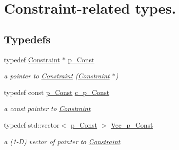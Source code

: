 \hypertarget{group___constraint___t_y_p_e_s}{}\section{Constraint-\/related types.}
\label{group___constraint___t_y_p_e_s}
\subsection*{Typedefs}
\begin{DoxyCompactItemize}
\item 
\mbox{\label{group___constraint___t_y_p_e_s_gae2abae1fd3e9370e1c0cc9dfbb4d6718}} 
typedef \mbox{\hyperlink{class_s_m_spp__di__unipi__it_1_1_constraint}{Constraint}} $\ast$ \mbox{\hyperlink{group___constraint___t_y_p_e_s_gae2abae1fd3e9370e1c0cc9dfbb4d6718}{p\+\_\+\+Const}}
\begin{DoxyCompactList}\small\item\em a pointer to \mbox{\hyperlink{class_s_m_spp__di__unipi__it_1_1_constraint}{Constraint}} (\mbox{\hyperlink{class_s_m_spp__di__unipi__it_1_1_constraint}{Constraint}} $\ast$) \end{DoxyCompactList}\item 
\mbox{\label{group___constraint___t_y_p_e_s_ga9c035399735cd8e147d1f912ba79a1c2}} 
typedef const \mbox{\hyperlink{group___constraint___t_y_p_e_s_gae2abae1fd3e9370e1c0cc9dfbb4d6718}{p\+\_\+\+Const}} \mbox{\hyperlink{group___constraint___t_y_p_e_s_ga9c035399735cd8e147d1f912ba79a1c2}{c\+\_\+p\+\_\+\+Const}}
\begin{DoxyCompactList}\small\item\em a const pointer to \mbox{\hyperlink{class_s_m_spp__di__unipi__it_1_1_constraint}{Constraint}} \end{DoxyCompactList}\item 
\mbox{\label{group___constraint___t_y_p_e_s_ga4ce7980e39e7cfce6c532e9475fb5001}} 
typedef std\+::vector$<$ \mbox{\hyperlink{group___constraint___t_y_p_e_s_gae2abae1fd3e9370e1c0cc9dfbb4d6718}{p\+\_\+\+Const}} $>$ \mbox{\hyperlink{group___constraint___t_y_p_e_s_ga4ce7980e39e7cfce6c532e9475fb5001}{Vec\+\_\+p\+\_\+\+Const}}
\begin{DoxyCompactList}\small\item\em a (1-\/D) vector of pointer to \mbox{\hyperlink{class_s_m_spp__di__unipi__it_1_1_constraint}{Constraint}} \end{DoxyCompactList}\item 

\end{DoxyCompactItemize}
